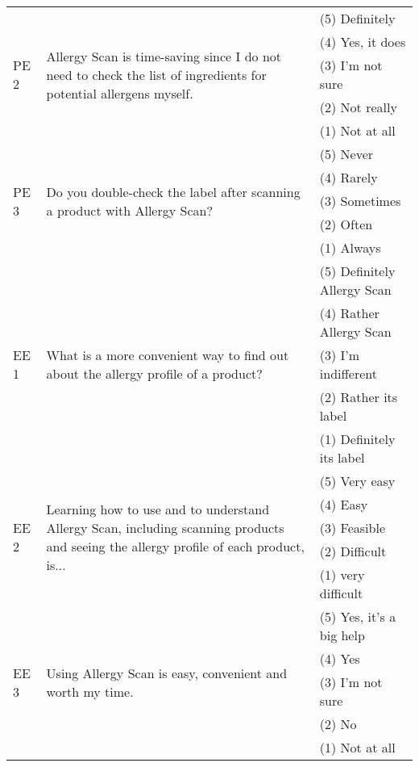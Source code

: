 \begin{longtable}{p{1cm} p{8cm} p{5.5cm}}
\hline

\multirow{5}{*}{PE 2}
& \multirow{5}{8cm}{Allergy Scan is time-saving since I do not need to check the list of ingredients for potential allergens myself.}
& (5) Definitely\\ 
& & (4) Yes, it does\\
& & (3) I'm not sure\\
& & (2) Not really\\
& & (1) Not at all\\

\hline

\multirow{5}{*}{PE 3}
& \multirow{5}{8cm}{Do you double-check the label after scanning a product with Allergy Scan?}
& (5) Never\\ 
& & (4) Rarely\\
& & (3) Sometimes\\
& & (2) Often\\
& & (1) Always\\

\hline

\multirow{5}{*}{EE 1}
& \multirow{5}{8cm}{What is a more convenient way to find out about the allergy profile of a product?}
& (5) Definitely Allergy Scan\\ 
& & (4) Rather Allergy Scan\\
& & (3) I'm indifferent\\
& & (2) Rather its label\\
& & (1) Definitely its label\\

\hline

\multirow{5}{*}{EE 2}
& \multirow{5}{8cm}{Learning how to use and to understand Allergy Scan, including scanning products and seeing the allergy profile of each product, is...}
& (5) Very easy\\ 
& & (4) Easy\\
& & (3) Feasible\\
& & (2) Difficult\\
& & (1) very difficult\\

\hline

\multirow{5}{*}{EE 3}
& \multirow{5}{8cm}{Using Allergy Scan is easy, convenient and worth my time.}
& (5) Yes, it's a big help\\ 
& & (4) Yes\\
& & (3) I'm not sure\\
& & (2) No\\
& & (1) Not at all\\

\bottomrule

\end{longtable}


